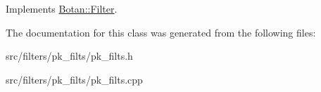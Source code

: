 Implements \hyperlink{classBotan_1_1Filter_ad856ce62d9bdcce8057da99cba606892}{Botan\-::\-Filter}.



The documentation for this class was generated from the following files\-:\begin{DoxyCompactItemize}
\item 
src/filters/pk\-\_\-filts/pk\-\_\-filts.\-h\item 
src/filters/pk\-\_\-filts/pk\-\_\-filts.\-cpp\end{DoxyCompactItemize}
